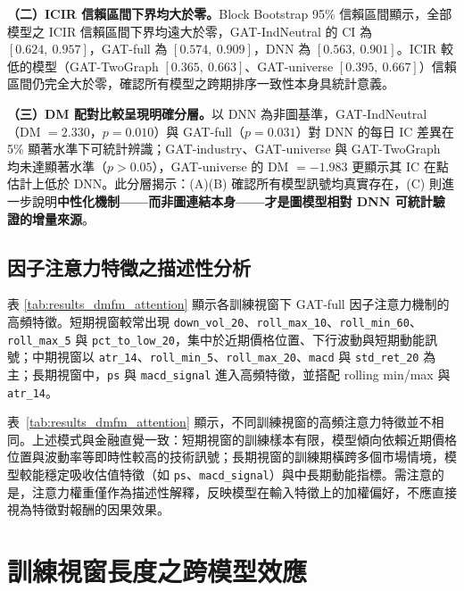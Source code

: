 \textbf{（二）ICIR 信賴區間下界均大於零。}Block Bootstrap 95\% 信賴區間顯示，全部模型之 ICIR 信賴區間下界均遠大於零，GAT-IndNeutral 的 CI 為 $[0.624,\ 0.957]$，GAT-full 為 $[0.574,\ 0.909]$，DNN 為 $[0.563,\ 0.901]$。ICIR 較低的模型（GAT-TwoGraph $[0.365,\ 0.663]$、GAT-universe $[0.395,\ 0.667]$）信賴區間仍完全大於零，確認所有模型之跨期排序一致性本身具統計意義。

\textbf{（三）DM 配對比較呈現明確分層。}以 DNN 為非圖基準，GAT-IndNeutral（DM $= 2.330$，$p = 0.010$）與 GAT-full（$p = 0.031$）對 DNN 的每日 IC 差異在 5\% 顯著水準下可統計辨識；GAT-industry、GAT-universe 與 GAT-TwoGraph 均未達顯著水準（$p > 0.05$），GAT-universe 的 DM $= -1.983$ 更顯示其 IC 在點估計上低於 DNN。此分層揭示：(A)(B) 確認所有模型訊號均真實存在，(C) 則進一步說明\textbf{中性化機制——而非圖連結本身——才是圖模型相對 DNN 可統計驗證的增量來源}。

\subsection{因子注意力特徵之描述性分析}
\label{subsec:attention_analysis}

表 \ref{tab:results_dmfm_attention} 顯示各訓練視窗下 GAT-full 因子注意力機制的高頻特徵。短期視窗較常出現 \texttt{down\_vol\_20}、\allowbreak \texttt{roll\_max\_10}、\allowbreak \texttt{roll\_min\_60}、\allowbreak \texttt{roll\_max\_5} 與 \texttt{pct\_to\_low\_20}，集中於近期價格位置、下行波動與短期動能訊號；中期視窗以 \texttt{atr\_14}、\allowbreak \texttt{roll\_min\_5}、\linebreak[4] \texttt{roll\_max\_20}、\allowbreak \texttt{macd} 與 \texttt{std\_ret\_20} 為主；長期視窗中，\texttt{ps} 與 \texttt{macd\_signal} 進入高頻特徵，並搭配 rolling min/max 與 \texttt{atr\_14}。



表~\ref{tab:results_dmfm_attention} 顯示，不同訓練視窗的高頻注意力特徵並不相同。上述模式與金融直覺一致：短期視窗的訓練樣本有限，模型傾向依賴近期價格位置與波動率等即時性較高的技術訊號；長期視窗的訓練期橫跨多個市場情境，模型較能穩定吸收估值特徵（如 \texttt{ps}、\texttt{macd\_signal}）與中長期動能指標。需注意的是，注意力權重僅作為描述性解釋，反映模型在輸入特徵上的加權偏好，不應直接視為特徵對報酬的因果效果。

\FloatBarrier

\section{訓練視窗長度之跨模型效應}
\label{sec:window_results}


